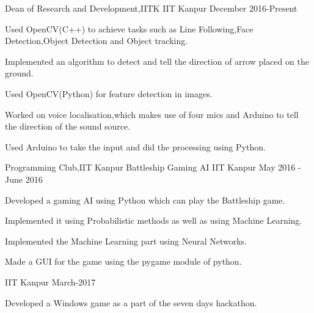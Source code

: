


\begin{cventries}

  \cventry
  {Dean of Research and Development,IITK}
  {{}
    {}}
  {IIT Kanpur}
  {December 2016-Present}
  {
    \begin{cvitems}
    \item Used OpenCV(C++) to achieve  tasks such as Line Following,Face Detection,Object Detection and Object tracking.
    \item Implemented an algorithm to detect and tell the direction of arrow placed on the ground.
    \item Used OpenCV(Python) for feature detection in images.
    \item Worked on voice localisation,which makes use of four mics and Arduino to tell the direction of the sound source.
    \item Used Arduino to take the input and did the processing using Python.
    \end{cvitems}
    \vspace{-5mm}
  }
  \cventry
  {Programming Club,IIT Kanpur}
  {Battleship Gaming AI}
  {IIT Kanpur}
  {May 2016 - June 2016}
  {
    \begin{cvitems}
      \item Developed a gaming AI using Python which can play the Battleship game.
      \item Implemented it using Probabilistic methods as well as using Machine Learning.
      \item Implemented the Machine Learning part using Neural Networks.
      \item Made a GUI for the game using the pygame module of python.
    \end{cvitems}
  }
  \cventry
  {}
  {{}}
  {IIT Kanpur}
  {March-2017}
  {
    \begin{cvitems}
    \item Developed a Windows game as a part of the seven days hackathon.
    \end{cvitems}
  }
\end{cventries}

